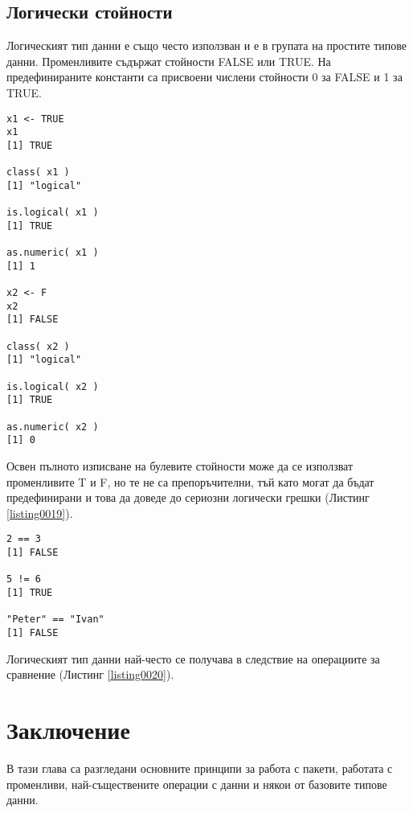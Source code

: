 \subsection{Логически стойности}

Логическият тип данни е също често използван и е в групата на простите типове данни. Променливите съдържат стойности FALSE или TRUE. На предефинираните константи са присвоени числени стойности 0 за FALSE и 1 за TRUE.

\begin{lstlisting}[caption=Логически тип данни, label=listing0019]
x1 <- TRUE
x1
[1] TRUE

class( x1 )
[1] "logical"

is.logical( x1 )
[1] TRUE

as.numeric( x1 )
[1] 1

x2 <- F
x2
[1] FALSE

class( x2 )
[1] "logical"

is.logical( x2 )
[1] TRUE

as.numeric( x2 )
[1] 0
\end{lstlisting}

Освен пълното изписване на булевите стойности може да се използват променливите T и F, но те не са препоръчителни, тъй като могат да бъдат предефинирани и това да доведе до сериозни логически грешки (Листинг \ref{listing0019}).

\begin{lstlisting}[caption=Операции за сравнение, label=listing0020]
2 == 3
[1] FALSE

5 != 6
[1] TRUE

"Peter" == "Ivan"
[1] FALSE
\end{lstlisting}

Логическият тип данни най-често се получава в следствие на операциите за сравнение (Листинг \ref{listing0020}).

\section*{Заключение}

В тази глава са разгледани основните принципи за работа с пакети, работата с променливи, най-съществените операции с данни и някои от базовите типове данни.
